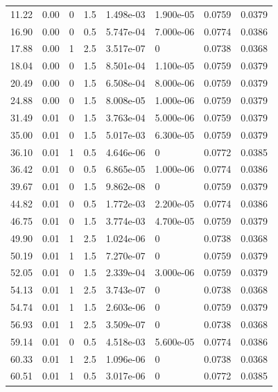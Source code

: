 \documentclass[preview]{standalone}
\begin{document}
{{\begin{tabular}{L{1.2cm}C{1.2cm} C{0.3cm}C{0.5cm} C{1.4cm}C{1.4cm} C{1.4cm}C{1.4cm}}
  11.22  &  0.00  & 0     & 1.5 &  1.498e-03  & 1.900e-05  & 0.0759 &  0.0379   \\ 
  16.90  &  0.00  & 0     & 0.5 &  5.747e-04  & 7.000e-06  & 0.0774 &  0.0386   \\ 
  17.88  &  0.00  & 1     & 2.5 &  3.517e-07  & 0  & 0.0738 &  0.0368   \\ 
  18.04  &  0.00  & 0     & 1.5 &  8.501e-04  & 1.100e-05  & 0.0759 &  0.0379   \\ 
  20.49  &  0.00  & 0     & 1.5 &  6.508e-04  & 8.000e-06  & 0.0759 &  0.0379   \\ 
  24.88  &  0.00  & 0     & 1.5 &  8.008e-05  & 1.000e-06  & 0.0759 &  0.0379   \\ 
  31.49  &  0.01  & 0     & 1.5 &  3.763e-04  & 5.000e-06  & 0.0759 &  0.0379   \\ 
  35.00  &  0.01  & 0     & 1.5 &  5.017e-03  & 6.300e-05  & 0.0759 &  0.0379   \\ 
  36.10  &  0.01  & 1     & 0.5 &  4.646e-06  & 0  & 0.0772 &  0.0385   \\ 
  36.42  &  0.01  & 0     & 0.5 &  6.865e-05  & 1.000e-06  & 0.0774 &  0.0386   \\ 
  39.67  &  0.01  & 0     & 1.5 &  9.862e-08  & 0  & 0.0759 &  0.0379   \\ 
  44.82  &  0.01  & 0     & 0.5 &  1.772e-03  & 2.200e-05  & 0.0774 &  0.0386   \\ 
  46.75  &  0.01  & 0     & 1.5 &  3.774e-03  & 4.700e-05  & 0.0759 &  0.0379   \\ 
  49.90  &  0.01  & 1     & 2.5 &  1.024e-06  & 0  & 0.0738 &  0.0368   \\ 
  50.19  &  0.01  & 1     & 1.5 &  7.270e-07  & 0  & 0.0759 &  0.0379   \\ 
  52.05  &  0.01  & 0     & 1.5 &  2.339e-04  & 3.000e-06  & 0.0759 &  0.0379   \\ 
  54.13  &  0.01  & 1     & 2.5 &  3.743e-07  & 0  & 0.0738 &  0.0368   \\ 
  54.74  &  0.01  & 1     & 1.5 &  2.603e-06  & 0  & 0.0759 &  0.0379   \\ 
  56.93  &  0.01  & 1     & 2.5 &  3.509e-07  & 0  & 0.0738 &  0.0368   \\ 
  59.14  &  0.01  & 0     & 0.5 &  4.518e-03  & 5.600e-05  & 0.0774 &  0.0386   \\ 
  60.33  &  0.01  & 1     & 2.5 &  1.096e-06  & 0  & 0.0738 &  0.0368   \\ 
  60.51  &  0.01  & 1     & 0.5 &  3.017e-06  & 0  & 0.0772 &  0.0385   \\ 

\end{tabular}}}
\end{document}
